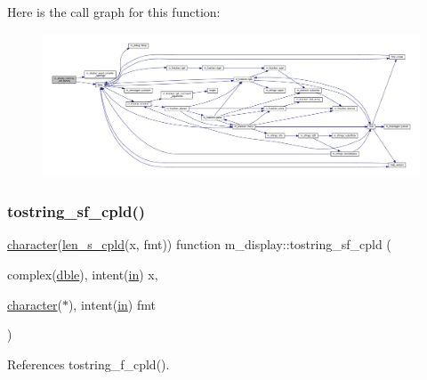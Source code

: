 Here is the call graph for this function\+:
\nopagebreak
\begin{figure}[H]
\begin{center}
\leavevmode
\includegraphics[width=350pt]{namespacem__display_abf51a5db397d27e0c6cb39e9f3fa7e24_cgraph}
\end{center}
\end{figure}
\mbox{\label{namespacem__display_a9f3f8dad4340213fd6587a5657b366e0}} 
\subsubsection{\texorpdfstring{tostring\+\_\+sf\+\_\+cpld()}{tostring\_sf\_cpld()}}
{\footnotesize\ttfamily \hyperlink{option__stopwatch_83_8txt_abd4b21fbbd175834027b5224bfe97e66}{character}(\hyperlink{namespacem__display_ace35690c2f36e28f07336cc7dcff47f4}{len\+\_\+s\+\_\+cpld}(x, fmt)) function m\+\_\+display\+::tostring\+\_\+sf\+\_\+cpld (\begin{DoxyParamCaption}\item[{complex(\hyperlink{namespacem__display_a46d90b75b6ccef7ccade133e5847e815}{dble}), intent(\hyperlink{M__journal_83_8txt_afce72651d1eed785a2132bee863b2f38}{in})}]{x,  }\item[{\hyperlink{option__stopwatch_83_8txt_abd4b21fbbd175834027b5224bfe97e66}{character}($\ast$), intent(\hyperlink{M__journal_83_8txt_afce72651d1eed785a2132bee863b2f38}{in})}]{fmt }\end{DoxyParamCaption})\hspace{0.3cm}{\ttfamily [private]}}



References tostring\+\_\+f\+\_\+cpld().

